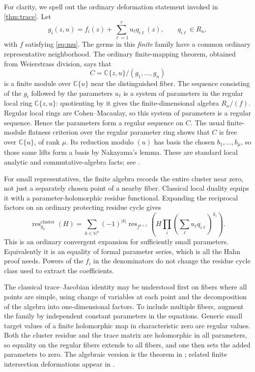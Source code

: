 \documentclass[11pt,letterpaper]{article}
\theoremstyle{definition}
\theoremstyle{remark}
\newcommand{\C}{\mathbb C}
\newcommand{\N}{\mathbb N}
\newcommand{\res}{\operatorname{res}}
\numberwithin{equation}{section}
\begin{document}
For clarity, we spell out the ordinary deformation statement invoked in \cref{thm:trace}. Let
\[
 g_i(z,u)=f_i(z)+\sum_{\ell=1}^r u_\ell q_{i\ell}(z),
 \qquad q_{i\ell}\in R_n,
\]
with $f$ satisfying \eqref{eq:mu}. The germs in this \emph{finite} family have a common ordinary representative neighborhood. The ordinary finite-mapping theorem, obtained from Weierstrass division, says that
\[
 C=\C\{z,u\}/(g_1,\ldots,g_n)
\]
is a finite module over $\C\{u\}$ near the distinguished fiber. The sequence consisting of the $g_i$ followed by the parameters $u_\ell$ is a system of parameters in the regular local ring $\C\{z,u\}$: quotienting by it gives the finite-dimensional algebra $R_n/(f)$. Regular local rings are Cohen--Macaulay, so this system of parameters is a regular sequence. Hence the parameters form a regular sequence on $C$. The usual finite-module flatness criterion over the regular parameter ring shows that $C$ is free over $\C\{u\}$, of rank $\mu$. Its reduction modulo $(u)$ has basis the chosen $b_1,\ldots,b_\mu$, so those same lifts form a basis by Nakayama's lemma. These are standard local analytic and commutative-algebra facts; see \cite{GR,Stacks}.

For small representatives, the finite algebra records the entire cluster near zero, not just a separately chosen point of a nearby fiber. Classical local duality equips it with a parameter-holomorphic residue functional. Expanding the reciprocal factors on an ordinary protecting residue cycle gives
\[
 \res^{\mathrm{cluster}}_{g_u}(H)
 =\sum_{k\in\N^n}(-1)^{|k|}
 \res_{f^{k+1}}
 \left(H\prod_i\left(\sum_\ell u_\ell q_{i\ell}\right)^{k_i}\right).
\]
This is an ordinary convergent expansion for sufficiently small parameters. Equivalently it is an equality of formal parameter series, which is all the Hahn proof needs. Powers of the $f_i$ in the denominators do not change the residue cycle class used to extract the coefficients.

The classical trace--Jacobian identity may be understood first on fibers where all points are simple, using change of variables at each point and the decomposition of the algebra into one-dimensional factors. To include multiple fibers, augment the family by independent constant parameters in the equations. Generic small target values of a finite holomorphic map in characteristic zero are regular values. Both the cluster residue and the trace matrix are holomorphic in all parameters, so equality on the regular fibers extends to all fibers, and one then sets the added parameters to zero. The algebraic version is the theorem in \cite{SS}; related finite intersection deformations appear in \cite{KW}.
\end{document}
